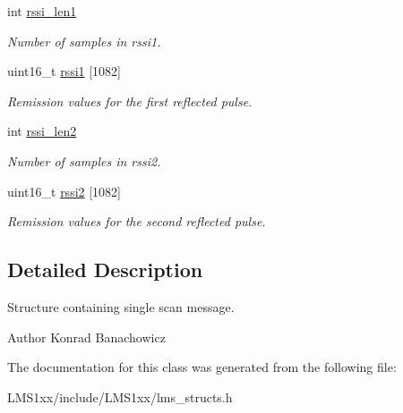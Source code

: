 \begin{DoxyCompactItemize}
\mbox{\label{structscanData_ab3d502879b0d18d643373118f87373b2}} 
int \hyperlink{structscanData_ab3d502879b0d18d643373118f87373b2}{rssi\+\_\+len1}
\begin{DoxyCompactList}\small\item\em Number of samples in rssi1. \end{DoxyCompactList}\item 
\mbox{\label{structscanData_a18ded2bb09e44b2c6312703cfaa17f44}} 
uint16\+\_\+t \hyperlink{structscanData_a18ded2bb09e44b2c6312703cfaa17f44}{rssi1} \mbox{[}1082\mbox{]}
\begin{DoxyCompactList}\small\item\em Remission values for the first reflected pulse. \end{DoxyCompactList}\item 
\mbox{\label{structscanData_a761e5bee9a5666423da6f47dcb4e122a}} 
int \hyperlink{structscanData_a761e5bee9a5666423da6f47dcb4e122a}{rssi\+\_\+len2}
\begin{DoxyCompactList}\small\item\em Number of samples in rssi2. \end{DoxyCompactList}\item 
\mbox{\label{structscanData_abbf47be378603a7b3271ba5482879729}} 
uint16\+\_\+t \hyperlink{structscanData_abbf47be378603a7b3271ba5482879729}{rssi2} \mbox{[}1082\mbox{]}
\begin{DoxyCompactList}\small\item\em Remission values for the second reflected pulse. \end{DoxyCompactList}\end{DoxyCompactItemize}


\subsection{Detailed Description}
Structure containing single scan message. 

\begin{DoxyAuthor}{Author}
Konrad Banachowicz 
\end{DoxyAuthor}


The documentation for this class was generated from the following file\+:\begin{DoxyCompactItemize}
\item 
L\+M\+S1xx/include/\+L\+M\+S1xx/lms\+\_\+structs.\+h\end{DoxyCompactItemize}
